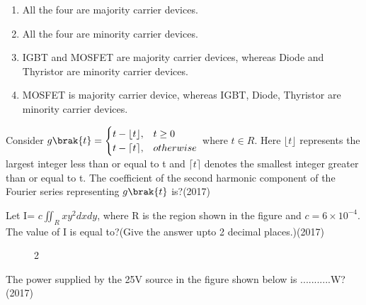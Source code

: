     \begin{enumerate}[label=(\Alph*)]
        \item All the four are majority carrier devices.
        \item All the four are minority carrier devices.
        \item IGBT and MOSFET are majority carrier devices, whereas Diode and Thyristor are minority carrier devices.
        \item MOSFET is majority carrier device, whereas IGBT, Diode, Thyristor are minority carrier devices.
    \end{enumerate}
    \item Consider $g\brak{t}=\begin{cases}t-\lfloor t \rfloor, & t\geq 0\\ t-\lceil t \rceil, & otherwise \end{cases}$ where $t \in R$. Here $\lfloor t \rfloor$ represents the largest integer less than or equal to t and  $\lceil t \rceil$ denotes the smallest integer greater than or equal to t. The coefficient of the second harmonic component of the Fourier series representing $g\brak{t}$ is?\hfill (2017)
    \item[17.] Let I= $c\iint_R xy^2 dxdy$, where R is the region shown in the figure and $c = 6\times 10^{-4}$. The value of I is equal to?(Give the answer upto 2 decimal places.)\hfill (2017)
    \begin{figure}[!ht]
        \centering
        \caption{2}
    \end{figure}
    \newpage
    \item The power supplied by the 25V source in the figure shown below is ...........W?\hfill (2017)
